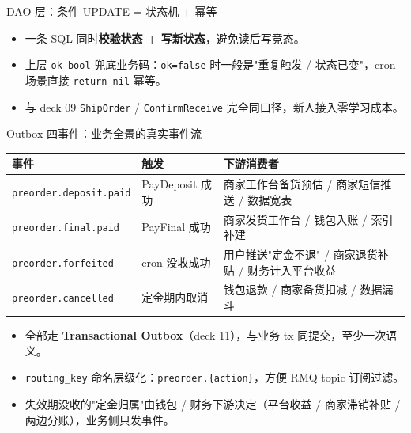\documentclass[aspectratio=169,11pt]{beamer}
\begin{document}
\begin{frame}[shrink]{DAO 层：条件 UPDATE = 状态机 + 幂等}
\vspace{1mm}
\begin{itemize}\small
  \item 一条 SQL 同时\textbf{校验状态 + 写新状态}，避免读后写竞态。
  \item 上层 \texttt{ok bool} 兜底业务码：\texttt{ok=false} 时一般是"重复触发 / 状态已变"，cron 场景直接 \texttt{return nil} 幂等。
  \item 与 deck 09 \texttt{ShipOrder} / \texttt{ConfirmReceive} 完全同口径，新人接入零学习成本。
\end{itemize}
\end{frame}

\begin{frame}[shrink]{Outbox 四事件：业务全景的真实事件流}
{\footnotesize
\begin{tabular}{@{}llp{6cm}@{}}
\toprule
事件 & 触发 & 下游消费者 \\
\midrule
\texttt{preorder.deposit.paid} & PayDeposit 成功 & 商家工作台备货预估 / 商家短信推送 / 数据宽表 \\
\texttt{preorder.final.paid}   & PayFinal 成功   & 商家发货工作台 / 钱包入账 / 索引补建 \\
\texttt{preorder.forfeited}    & cron 没收成功   & 用户推送"定金不退" / 商家退货补贴 / 财务计入平台收益 \\
\texttt{preorder.cancelled}    & 定金期内取消    & 钱包退款 / 商家备货扣减 / 数据漏斗 \\
\bottomrule
\end{tabular}}
\vspace{2mm}
\begin{itemize}\small
  \item 全部走 \textbf{Transactional Outbox}（deck 11），与业务 tx 同提交，至少一次语义。
  \item \texttt{routing\_key} 命名层级化：\texttt{preorder.\{action\}}，方便 RMQ topic 订阅过滤。
  \item 失效期没收的"定金归属"由钱包 / 财务下游决定（平台收益 / 商家滞销补贴 / 两边分账），业务侧只发事件。
\end{itemize}
\end{frame}
\end{document}
